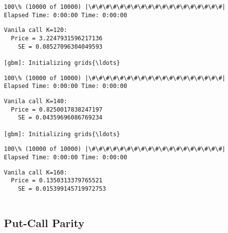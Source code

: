 \documentclass[11pt]{article}
\begin{document}
    \begin{Verbatim}[commandchars=\\\{\}]
100\% (10000 of 10000) |\#\#\#\#\#\#\#\#\#\#\#\#\#\#\#\#\#\#\#| Elapsed Time: 0:00:00 Time: 0:00:00

    \end{Verbatim}

    \begin{Verbatim}[commandchars=\\\{\}]
Vanila call K=120:
  Price = 3.2247931596217136
    SE = 0.08527096304049593

[gbm]: Initializing grids{\ldots}

    \end{Verbatim}

    \begin{Verbatim}[commandchars=\\\{\}]
100\% (10000 of 10000) |\#\#\#\#\#\#\#\#\#\#\#\#\#\#\#\#\#\#\#| Elapsed Time: 0:00:00 Time: 0:00:00

    \end{Verbatim}

    \begin{Verbatim}[commandchars=\\\{\}]
Vanila call K=140:
  Price = 0.8250017838247197
    SE = 0.04359696086769234

[gbm]: Initializing grids{\ldots}

    \end{Verbatim}

    \begin{Verbatim}[commandchars=\\\{\}]
100\% (10000 of 10000) |\#\#\#\#\#\#\#\#\#\#\#\#\#\#\#\#\#\#\#| Elapsed Time: 0:00:00 Time: 0:00:00

    \end{Verbatim}

    \begin{Verbatim}[commandchars=\\\{\}]
Vanila call K=160:
  Price = 0.1350313379765521
    SE = 0.015399145719972753


    \end{Verbatim}

    \subsection{Put-Call Parity}\label{put-call-parity}
\end{document}
